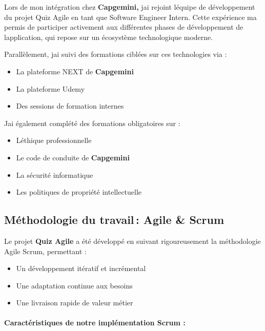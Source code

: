 \documentclass[12pt,a4paper,twoside,openright]{report}
\begin{document}
Lors de mon intégration chez \textbf{Capgemini,} j\textquotesingle ai
rejoint l\textquotesingle équipe de développement du projet Quiz Agile
en tant que Software Engineer Intern. Cette expérience
m\textquotesingle a permis de participer activement aux différentes
phases de développement de l\textquotesingle application, qui repose sur
un écosystème technologique moderne.

Parallèlement, j\textquotesingle ai suivi des formations ciblées sur ces
technologies via :

\begin{itemize}
\item
  La plateforme NEXT de \textbf{Capgemini}
\item
  La plateforme Udemy
\item
  Des sessions de formation internes
\end{itemize}

J\textquotesingle ai également complété des formations obligatoires sur
:

\begin{itemize}
\item
  L\textquotesingle éthique professionnelle
\item
  Le code de conduite de \textbf{Capgemini}
\item
  La sécurité informatique
\item
  Les politiques de propriété intellectuelle
\end{itemize}

\hypertarget{muxe9thodologie-du-travail-agile-scrum}{%
\subsection{Méthodologie du travail\,: Agile \&
Scrum}\label{muxe9thodologie-du-travail-agile-scrum}}

Le projet \textbf{Quiz Agile} a été développé en suivant rigoureusement
la méthodologie Agile Scrum, permettant :

\begin{itemize}
\item
  Un développement itératif et incrémental
\item
  Une adaptation continue aux besoins
\item
  Une livraison rapide de valeur métier
\end{itemize}

\hypertarget{caractuxe9ristiques-de-notre-impluxe9mentation-scrum}{%
\paragraph{Caractéristiques de notre implémentation Scrum
:}\label{caractuxe9ristiques-de-notre-impluxe9mentation-scrum}}
\end{document}
